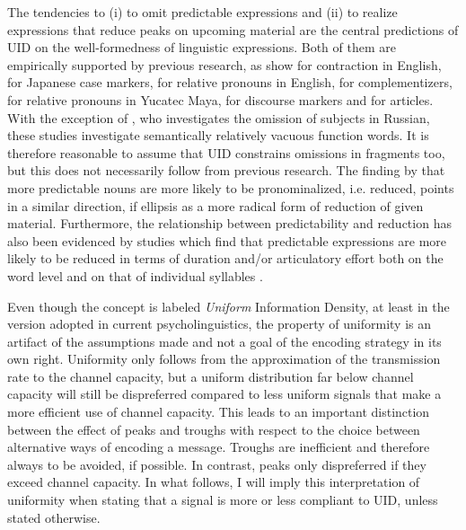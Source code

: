 The tendencies to (i) to omit predictable expressions and (ii) to realize expressions that reduce peaks on upcoming material are the central predictions of UID on the well-formedness of linguistic expressions. Both of them are empirically supported by previous research, as \citet{frank.jaeger2008} show for contraction in English, \citet{kurumada.jaeger2015} for Japanese case markers, \citet{levy.jaeger2007} for relative pronouns in English, \citet{jaeger2010} for complementizers, \citet{norcliffe.jaeger2016} for relative pronouns in Yucatec Maya, \citet{asr.demberg2015} for discourse markers and \citet{lemke.etal2017} for articles. With the exception of \citet{kravtchenko2014}, who investigates the omission of subjects in Russian, these studies investigate semantically relatively vacuous function words. It is therefore reasonable to assume that UID constrains omissions in fragments too, but this does not necessarily follow from previous research. The finding by \citet{tily.piantadosi2009} that more predictable nouns are more likely to be pronominalized, i.e. reduced, points in a similar direction, if ellipsis as a more radical form of reduction of given material. Furthermore, the relationship between predictability and reduction has also been evidenced by studies which find that predictable expressions are more likely to be reduced in terms of duration and/or articulatory effort both on the word level and on that of individual syllables \citep[see e.g.][]{bell.etal2003, aylett.turk2004,  bell.etal2009, tily.etal2009, demberg.etal2012, kuperman.bresnan2012, seyfarth2014, pate.goldwater2015, brandt.etal2017, brandt.etal2018,  malisz.etal2018}.

Even though the concept is labeled \textit{Uniform} Information Density, at least in the version adopted in current psycholinguistics, the property of uniformity is an artifact of the assumptions made and not a goal of the encoding strategy in its own right. Uniformity only follows from the approximation of the transmission rate to the channel capacity, but a uniform distribution far below channel capacity will still be dispreferred compared to less uniform signals that make a more efficient use of channel capacity. This leads to an important distinction between the effect of peaks and troughs with respect to the choice between alternative ways of encoding a message. Troughs are inefficient and therefore always to be avoided, if possible. In contrast, peaks only dispreferred if they exceed channel capacity. In what follows, I will imply this interpretation of uniformity when stating that a signal is more or less compliant to UID, unless stated otherwise.

